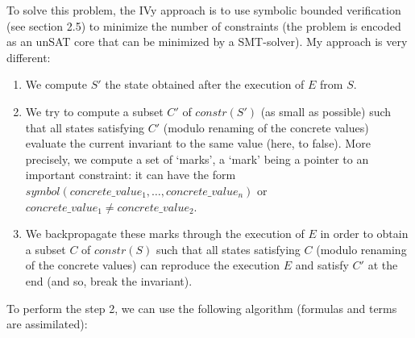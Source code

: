 \documentclass[11pt,a4paper,oldfontcommands,openany]{memoir}
\begin{document}
    To solve this problem, the IVy approach is to use symbolic bounded verification (see section 2.5) to minimize the number of constraints (the problem is encoded as an unSAT core that can be minimized by a SMT-solver).
    My approach is very different:
    \begin{enumerate}
        \item We compute \(S'\) the state obtained after the execution of \(E\) from \(S\).
        \item We try to compute a subset \(C'\) of \(constr(S')\) (as small as possible) such that all states satisfying \(C'\) (modulo renaming of the concrete values)
        evaluate the current invariant to the same value (here, to false). More precisely, we compute a set of `marks', a `mark' being a pointer to an important constraint:
        it can have the form \(symbol(concrete\_value_1,\ldots,concrete\_value_n)\) or \(concrete\_value_1 \neq concrete\_value_2\).
        \item We backpropagate these marks through the execution of \(E\) in order to obtain a subset \(C\) of \(constr(S)\) such that
        all states satisfying \(C\) (modulo renaming of the concrete values) can reproduce the execution \(E\) and satisfy \(C'\) at the end (and so, break the invariant).
    \end{enumerate}

    To perform the step 2, we can use the following algorithm (formulas and terms are assimilated):
\end{document}
